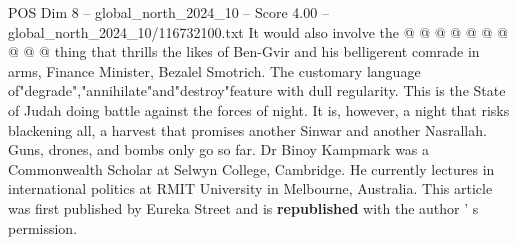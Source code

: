\begin{textsample}{POS Dim 8 – global\_north\_2024\_10 – Score 4.00 – global\_north\_2024\_10/116732100.txt}
It would also involve the @ @ @ @ @ @ @ @ @ @ thing that thrills the likes of Ben-Gvir and his belligerent comrade in arms, Finance Minister, Bezalel Smotrich.
The customary language of"degrade","annihilate"and"destroy"feature with dull regularity.
This is the State of Judah doing battle against the forces of night.
It is, however, a night that risks blackening all, a harvest that promises another Sinwar and another Nasrallah.
Guns, drones, and bombs only go so far.
Dr Binoy Kampmark was a Commonwealth Scholar at Selwyn College, Cambridge.
He currently lectures in international politics at RMIT University in Melbourne, Australia.
This article was first published by Eureka Street and is \textbf{republished} with the author ' s permission.

\end{textsample}
